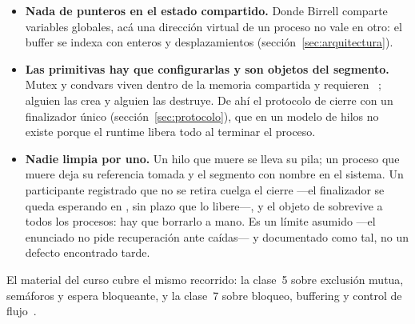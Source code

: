 \begin{itemize}
\item \textbf{Nada de punteros en el estado compartido.} Donde Birrell
      comparte variables globales, acá una dirección virtual de un proceso
      no vale en otro: el buffer se indexa con enteros y desplazamientos
      (sección~\ref{sec:arquitectura}).
\item \textbf{Las primitivas hay que configurarlas y son objetos del
      segmento.} Mutex y condvars viven dentro de la memoria compartida y
      requieren ~\cite{POSIX2024}; alguien
      las crea y alguien las destruye. De ahí el protocolo de cierre con un
      finalizador único (sección~\ref{sec:protocolo}), que en un modelo de
      hilos no existe porque el runtime libera todo al terminar el proceso.
\item \textbf{Nadie limpia por uno.} Un hilo que muere se lleva su pila; un
      proceso que muere deja su referencia tomada y el segmento con nombre
      en el sistema. Un participante registrado que no se retira cuelga el
      cierre ---el finalizador se queda esperando en , sin
      plazo que lo libere---, y el objeto de  sobrevive a
      todos
      los procesos: hay que borrarlo a mano. Es un límite asumido ---el
      enunciado no pide recuperación ante caídas--- y documentado como tal,
      no un defecto encontrado tarde.
\end{itemize}

El material del curso cubre el mismo recorrido: la clase~5 sobre exclusión
mutua, semáforos y espera bloqueante, y la clase~7 sobre bloqueo, buffering
y control de flujo~\cite{SanchezClases2026}.
